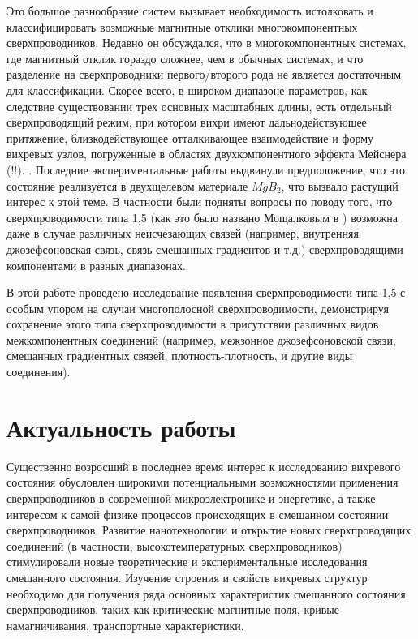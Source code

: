 Это большое разнообразие систем вызывает необходимость истолковать и 
классифицировать возможные магнитные отклики многокомпонентных 
сверхпроводников. Недавно он обсуждался, что в многокомпонентных системах, 
где магнитный отклик гораздо сложнее, чем в обычных системах, и что разделение 
на сверхпроводники первого/второго рода не является достаточным для 
классификации. Скорее всего, в широком диапазоне параметров, как следствие 
существовании трех основных масштабных длины, есть отдельный сверхпроводящий 
режим, при котором вихри имеют дальнодействующее притяжение, близкодействующее 
отталкивающее взаимодействие и форму вихревых узлов, погруженные в областях 
двухкомпонентного эффекта Мейснера (!!). \cite{bib:1,bib:2}. Последние 
экспериментальные работы \cite{bib:16,bib:17} выдвинули предположение, что 
это состояние реализуется в двухщелевом материале \( MgB_2 \), что вызвало 
растущий интерес к этой теме. В частности были подняты вопросы по поводу того, 
что сверхпроводимости типа 1,5 (как это было названо Мощалковым в 
\cite{bib:16}) возможна даже в случае различных неисчезающих связей (например, 
внутренняя джозефсоновская связь, связь смешанных градиентов и т.д.) 
сверхпроводящими компонентами в разных диапазонах.

В этой работе проведено исследование появления сверхпроводимости типа 1,5 с 
особым упором на случаи многополосной сверхпроводимости, демонстрируя 
сохранение этого типа сверхпроводимости в присутствии различных видов 
межкомпонентных соединений (например, межзонное джозефсоновской связи, 
смешанных градиентных связей, плотность-плотность, и другие виды соединения).

\section{Актуальность работы}
Существенно возросший в последнее время интерес к исследованию вихревого 
состояния обусловлен широкими потенциальными возможностями применения 
сверхпроводников в современной микроэлектронике и энергетике, а также 
интересом к самой физике процессов происходящих в смешанном состоянии 
сверхпроводников. Развитие нанотехнологии и открытие новых сверхпроводящих 
соединений (в частности, высокотемпературных сверхпроводников) стимулировали 
новые теоретические и экспериментальные исследования смешанного состояния. 
Изучение строения и свойств вихревых структур необходимо для получения ряда 
основных характеристик смешанного состояния сверхпроводников, таких как 
критические магнитные поля, кривые намагничивания, транспортные 
характеристики.


